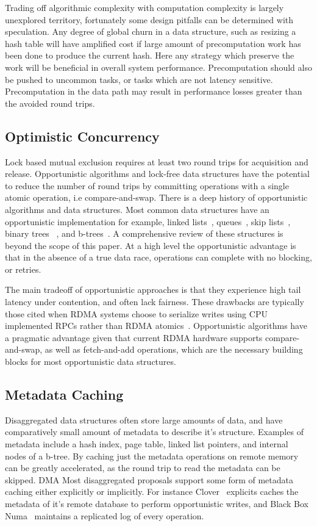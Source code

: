 Trading off algorithmic complexity with computation complexity is largely
unexplored territory, fortunately some design pitfalls can be determined with
speculation. Any degree of global churn in a data structure, such as resizing a
hash table will have amplified cost if large amount of precomputation work has
been done to produce the current hash. Here any strategy which preserve the work
will be beneficial in overall system performance. Precomputation should also be
pushed to uncommon tasks, or tasks which are not latency sensitive.
Precomputation in the data path may result in performance losses greater than
the avoided round trips.

\subsection{Optimistic Concurrency} 

Lock based mutual exclusion requires at least two round trips for acquisition
and release. Opportunistic algorithms and lock-free data structures have the
potential to reduce the number of round trips by committing operations with a
single atomic operation, i.e compare-and-swap. There is a deep history of
opportunistic algorithms and data structures. Most common data structures have
an opportunistic implementation for example, linked
lists~\cite{linked-list-cas}, queues~\cite{simple-fast}, skip
lists~\cite{lock-free-skip}, binary trees ~\cite{non-block-binary}, and
b-trees~\cite{read-concur-btree,lock-free-btree}. A comprehensive review of
these structures is beyond the scope of this paper. At a high level the
opportunistic advantage is that in the absence of a true data race, operations
can complete with no blocking, or retries.

The main tradeoff of opportunistic approaches is that they experience high tail
latency under contention, and often lack fairness. These drawbacks are typically
those cited when RDMA systems choose to serialize writes using CPU implemented
RPCs rather than RDMA atomics~\cite{pilaf, cell, herd}. Opportunistic algorithms
have a pragmatic advantage given that current RDMA hardware supports
compare-and-swap, as well as fetch-and-add operations, which are the necessary
building blocks for most opportunistic data structures.

\subsection{Metadata Caching}
Disaggregated data structures often store large amounts of data, and have
comparatively small amount of metadata to describe it's structure. Examples of
metadata include a hash index, page table, linked list pointers, and internal
nodes of a b-tree. By caching just the metadata operations on remote memory can
be greatly accelerated, as the round trip to read the metadata can be skipped.
DMA 
Most disaggregated proposals support some form of metadata caching either
explicitly or implicitly. For instance Clover~\cite{clover} explicits caches the
metadata of it's remote database to perform opportunistic writes, and Black Box
Numa~\cite{black-box-numa} maintains a replicated log of every operation. 

